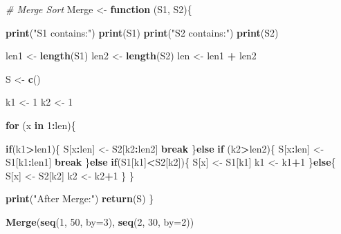 \documentclass[]{article}
\newenvironment{Shaded}{\begin{snugshade}}{\end{snugshade}}
\newcommand{\KeywordTok}[1]{\textcolor[rgb]{0.13,0.29,0.53}{\textbf{#1}}}
\newcommand{\DataTypeTok}[1]{\textcolor[rgb]{0.13,0.29,0.53}{#1}}
\newcommand{\DecValTok}[1]{\textcolor[rgb]{0.00,0.00,0.81}{#1}}
\newcommand{\StringTok}[1]{\textcolor[rgb]{0.31,0.60,0.02}{#1}}
\newcommand{\CommentTok}[1]{\textcolor[rgb]{0.56,0.35,0.01}{\textit{#1}}}
\newcommand{\ControlFlowTok}[1]{\textcolor[rgb]{0.13,0.29,0.53}{\textbf{#1}}}
\newcommand{\OperatorTok}[1]{\textcolor[rgb]{0.81,0.36,0.00}{\textbf{#1}}}
\newcommand{\NormalTok}[1]{#1}
\begin{document}
\begin{Shaded}
\begin{Highlighting}[]
\CommentTok{# Merge Sort}
\NormalTok{Merge <-}\StringTok{ }\ControlFlowTok{function}\NormalTok{ (S1, S2)\{}
  
  \KeywordTok{print}\NormalTok{(}\StringTok{"S1 contains:"}\NormalTok{)}
  \KeywordTok{print}\NormalTok{(S1)}
  \KeywordTok{print}\NormalTok{(}\StringTok{"S2 contains:"}\NormalTok{)}
  \KeywordTok{print}\NormalTok{(S2)}
  
\NormalTok{  len1 <-}\StringTok{ }\KeywordTok{length}\NormalTok{(S1)}
\NormalTok{  len2 <-}\StringTok{ }\KeywordTok{length}\NormalTok{(S2)}
\NormalTok{  len <-}\StringTok{ }\NormalTok{len1 }\OperatorTok{+}\StringTok{ }\NormalTok{len2}
  
\NormalTok{  S <-}\StringTok{ }\KeywordTok{c}\NormalTok{()}
  
\NormalTok{  k1 <-}\StringTok{ }\DecValTok{1}
\NormalTok{  k2 <-}\StringTok{ }\DecValTok{1}
  
  \ControlFlowTok{for}\NormalTok{ (x }\ControlFlowTok{in} \DecValTok{1}\OperatorTok{:}\NormalTok{len)\{}
    
    \ControlFlowTok{if}\NormalTok{(k1}\OperatorTok{>}\NormalTok{len1)\{}
\NormalTok{      S[x}\OperatorTok{:}\NormalTok{len] <-}\StringTok{ }\NormalTok{S2[k2}\OperatorTok{:}\NormalTok{len2]}
      \ControlFlowTok{break}
\NormalTok{    \}}\ControlFlowTok{else} \ControlFlowTok{if}\NormalTok{ (k2}\OperatorTok{>}\NormalTok{len2)\{}
\NormalTok{      S[x}\OperatorTok{:}\NormalTok{len] <-}\StringTok{ }\NormalTok{S1[k1}\OperatorTok{:}\NormalTok{len1] }
      \ControlFlowTok{break}
\NormalTok{    \}}\ControlFlowTok{else} \ControlFlowTok{if}\NormalTok{(S1[k1]}\OperatorTok{<}\NormalTok{S2[k2])\{}
\NormalTok{      S[x] <-}\StringTok{ }\NormalTok{S1[k1]}
\NormalTok{      k1 <-}\StringTok{ }\NormalTok{k1}\OperatorTok{+}\DecValTok{1}
\NormalTok{    \}}\ControlFlowTok{else}\NormalTok{\{}
\NormalTok{      S[x] <-}\StringTok{ }\NormalTok{S2[k2]}
\NormalTok{      k2 <-}\StringTok{ }\NormalTok{k2}\OperatorTok{+}\DecValTok{1}
\NormalTok{    \}}
\NormalTok{  \}}
  
  \KeywordTok{print}\NormalTok{(}\StringTok{"After Merge:"}\NormalTok{)}
  \KeywordTok{return}\NormalTok{(S)}
\NormalTok{\}}

\KeywordTok{Merge}\NormalTok{(}\KeywordTok{seq}\NormalTok{(}\DecValTok{1}\NormalTok{, }\DecValTok{50}\NormalTok{, }\DataTypeTok{by=}\DecValTok{3}\NormalTok{), }\KeywordTok{seq}\NormalTok{(}\DecValTok{2}\NormalTok{, }\DecValTok{30}\NormalTok{, }\DataTypeTok{by=}\DecValTok{2}\NormalTok{))}
\end{Highlighting}
\end{Shaded}
\end{document}
